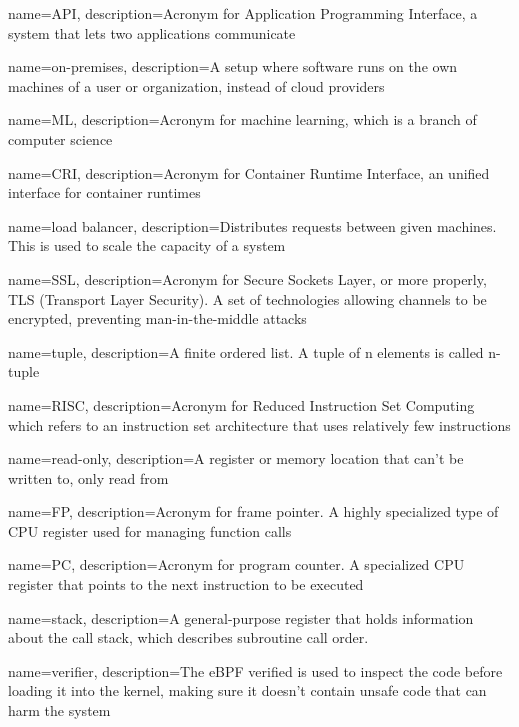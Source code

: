 {
    name=API,
    description={Acronym for Application Programming Interface, a system that lets two applications communicate}
}

{
    name=on-premises,
    description={A setup where software runs on the own machines of a user or organization, instead of cloud providers}
}

{
    name=ML,
    description={Acronym for machine learning, which is a branch of computer science}
}

{
    name=CRI,
    description={Acronym for Container Runtime Interface, an unified interface for container runtimes}
}

{
    name=load balancer,
    description={Distributes requests between given machines. This is used to scale the capacity of a system}
}

{
    name=SSL,
    description={Acronym for Secure Sockets Layer, or more properly, TLS (Transport Layer Security). A set of technologies allowing channels to be encrypted, preventing man-in-the-middle attacks}
}

{
    name=tuple,
    description={A finite ordered list. A tuple of n elements is called n-tuple}
}

{
    name=RISC,
    description={Acronym for Reduced Instruction Set Computing which refers to an instruction set architecture that uses relatively few instructions}
}

{
    name=read-only,
    description={A register or memory location that can't be written to, only read from}
}

{
    name=FP,
    description={Acronym for frame pointer. A highly specialized type of CPU register used for managing function calls}
}

{
    name=PC,
    description={Acronym for program counter. A specialized CPU register that points to the next instruction to be executed}
}

{
    name=stack,
    description={A general-purpose register that holds information about the call stack, which describes subroutine call order.}
}

{
    name=verifier,
    description={The eBPF verified is used to inspect the code before loading it into the kernel, making sure it doesn't contain unsafe code that can harm the system}
}

